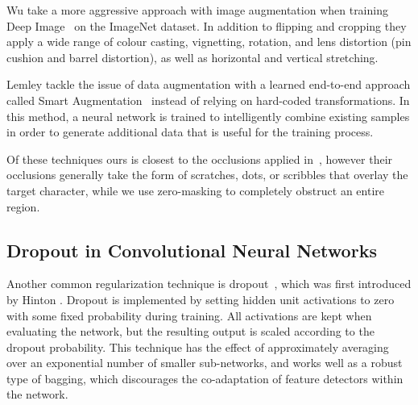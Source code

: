 \documentclass[10pt,twocolumn,letterpaper]{article}
\begin{document}
Wu \etal{} take a more aggressive approach with image augmentation when training Deep Image~\cite{wu2015deep} on the ImageNet dataset. In addition to flipping and cropping they apply a wide range of colour casting, vignetting, rotation, and lens distortion (pin cushion and barrel distortion), as well as horizontal and vertical stretching.

Lemley \etal{} tackle the issue of data augmentation with a learned end-to-end approach called Smart Augmentation~\cite{lemley2017smart} instead of relying on hard-coded transformations. In this method, a neural network is trained to intelligently combine existing samples in order to generate additional data that is useful for the training process.

Of these techniques ours is closest to the occlusions applied in~\cite{bengio2011deep}, however their occlusions generally take the form of scratches, dots, or scribbles that overlay the target character, while we use zero-masking to completely obstruct an entire region.


\subsection{Dropout in Convolutional Neural Networks}

Another common regularization technique is dropout~\cite{hinton2012improving, srivastava2014dropout}, which was first introduced by Hinton \etal. Dropout is implemented by setting hidden unit activations to zero with some fixed probability during training. All activations are kept when evaluating the network, but the resulting output is scaled according to the dropout probability. This technique has the effect of approximately averaging over an exponential number of smaller sub-networks, and works well as a robust type of bagging, which discourages the co-adaptation of feature detectors within the network.
\end{document}
